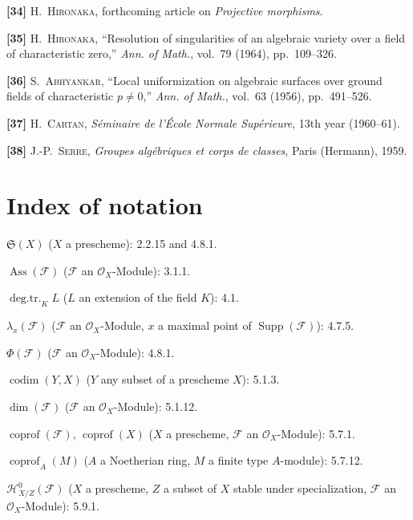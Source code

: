 \textbf{[34]} H.~\textsc{Hironaka}, forthcoming article on \emph{Projective
morphisms}.

\textbf{[35]} H.~\textsc{Hironaka}, ``Resolution of singularities of an
algebraic variety over a field of characteristic zero,'' \emph{Ann. of Math.},
vol.~79 (1964), pp.~109--326.

\textbf{[36]} S.~\textsc{Abhyankar}, ``Local uniformization on algebraic
surfaces over ground fields of characteristic $p\ne0$,'' \emph{Ann. of
Math.}, vol.~63 (1956), pp.~491--526.

\textbf{[37]} H.~\textsc{Cartan}, \emph{Séminaire de l'École Normale
Supérieure}, 13th year (1960--61).

\textbf{[38]} J.-P.~\textsc{Serre}, \emph{Groupes algébriques et corps de
classes}, Paris (Hermann), 1959.

\endgroup

\clearpage
{}
{}
\section*{Index of notation}

\begingroup
\small
\setlength{\parindent}{0pt}
\setlength{\parskip}{2pt}

$\mathfrak S(X)$ ($X$ a prescheme): 2.2.15 and 4.8.1.

$\operatorname{Ass}(\mathscr F)$ ($\mathscr F$ an $\mathcal O_X$-Module): 3.1.1.

$\operatorname{deg.tr.}_K L$ ($L$ an extension of the field $K$): 4.1.

$\lambda_x(\mathscr F)$ ($\mathscr F$ an $\mathcal O_X$-Module, $x$ a maximal
point of $\operatorname{Supp}(\mathscr F)$): 4.7.5.

$\Phi(\mathscr F)$ ($\mathscr F$ an $\mathcal O_X$-Module): 4.8.1.

$\operatorname{codim}(Y,X)$ ($Y$ any subset of a prescheme $X$): 5.1.3.

$\dim(\mathscr F)$ ($\mathscr F$ an $\mathcal O_X$-Module): 5.1.12.

$\operatorname{coprof}(\mathscr F)$, $\operatorname{coprof}(X)$ ($X$ a
prescheme, $\mathscr F$ an $\mathcal O_X$-Module): 5.7.1.

$\operatorname{coprof}_A(M)$ ($A$ a Noetherian ring, $M$ a finite type
$A$-module): 5.7.12.

$\mathcal H^0_{X/Z}(\mathscr F)$ ($X$ a prescheme, $Z$ a subset of $X$ stable
under specialization, $\mathscr F$ an $\mathcal O_X$-Module): 5.9.1.

